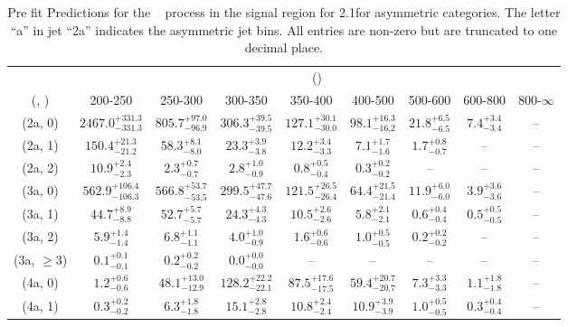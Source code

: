 \begin{table}[h!]
\tiny
\centering
\caption{Pre fit Predictions for the \zInv~ process in the signal region for 2.1\ifb for asymmetric categories. The letter ``a'' in jet \eg ``2a''  indicates the asymmetric jet bins. All entries are non-zero but are truncated to one decimal place.\label{tab:predsepnaive_sig_zinv_asym}}
\begin{tabular}
{ccccccccc}
	\hline\hline
	& \multicolumn{8}{c}{\scalht (\gev)} \\ 
	 (\njet,  \nb) & 200-250 & 250-300 & 300-350 & 350-400 & 400-500 & 500-600 & 600-800 & 800-$\infty$ \\ [0.8ex] 
\hline
	(2a, 0) & $2467.0^{+ 331.3 }_{- 331.3 }$ & $805.7^{+ 97.0 }_{- 96.9 }$ & $306.3^{+ 39.5 }_{- 39.5 }$ & $127.1^{+ 30.1 }_{- 30.0 }$ & $98.1^{+ 16.3 }_{- 16.2 }$ & $21.8^{+ 6.5 }_{- 6.5 }$ & $7.4^{+ 3.4 }_{- 3.4 }$ & -- \\[0.5ex] 
	(2a, 1) & $150.4^{+ 21.3 }_{- 21.2 }$ & $58.3^{+ 8.1 }_{- 8.0 }$ & $23.3^{+ 3.9 }_{- 3.8 }$ & $12.2^{+ 3.4 }_{- 3.3 }$ & $7.1^{+ 1.7 }_{- 1.6 }$ & $1.7^{+ 0.8 }_{- 0.7 }$ & -- & -- \\[0.5ex] 
	(2a, 2) & $10.9^{+ 2.4 }_{- 2.3 }$ & $2.3^{+ 0.7 }_{- 0.7 }$ & $2.8^{+ 1.0 }_{- 0.9 }$ & $0.8^{+ 0.5 }_{- 0.4 }$ & $0.3^{+ 0.2 }_{- 0.2 }$ & -- & -- & -- \\[0.5ex] 
	(3a, 0) & $562.9^{+ 106.4 }_{- 106.3 }$ & $566.8^{+ 53.7 }_{- 53.5 }$ & $299.5^{+ 47.7 }_{- 47.6 }$ & $121.5^{+ 26.5 }_{- 26.4 }$ & $64.4^{+ 21.5 }_{- 21.4 }$ & $11.9^{+ 6.0 }_{- 6.0 }$ & $3.9^{+ 3.6 }_{- 3.6 }$ & -- \\[0.5ex] 
	(3a, 1) & $44.7^{+ 8.9 }_{- 8.8 }$ & $52.7^{+ 5.7 }_{- 5.7 }$ & $24.3^{+ 4.3 }_{- 4.3 }$ & $10.5^{+ 2.6 }_{- 2.6 }$ & $5.8^{+ 2.1 }_{- 2.1 }$ & $0.6^{+ 0.4 }_{- 0.4 }$ & $0.5^{+ 0.5 }_{- 0.5 }$ & -- \\[0.5ex] 
	(3a, 2) & $5.9^{+ 1.4 }_{- 1.4 }$ & $6.8^{+ 1.1 }_{- 1.1 }$ & $4.0^{+ 1.0 }_{- 0.9 }$ & $1.6^{+ 0.6 }_{- 0.6 }$ & $1.0^{+ 0.5 }_{- 0.5 }$ & $0.2^{+ 0.2 }_{- 0.2 }$ & -- & -- \\[0.5ex] 
	(3a, $\ge3$) & $0.1^{+ 0.1 }_{- 0.1 }$ & $0.2^{+ 0.2 }_{- 0.2 }$ & $0.0^{+ 0.0 }_{- 0.0 }$ & -- & -- & -- & -- & -- \\[0.5ex] 
	(4a, 0) & $1.2^{+ 0.6 }_{- 0.6 }$ & $48.1^{+ 13.0 }_{- 12.9 }$ & $128.2^{+ 22.2 }_{- 22.1 }$ & $87.5^{+ 17.6 }_{- 17.5 }$ & $59.4^{+ 20.7 }_{- 20.7 }$ & $7.3^{+ 3.3 }_{- 3.3 }$ & $1.1^{+ 1.8 }_{- 1.8 }$ & -- \\[0.5ex] 
	(4a, 1) & $0.3^{+ 0.2 }_{- 0.2 }$ & $6.3^{+ 1.8 }_{- 1.8 }$ & $15.1^{+ 2.8 }_{- 2.8 }$ & $10.8^{+ 2.4 }_{- 2.4 }$ & $10.9^{+ 3.9 }_{- 3.9 }$ & $1.0^{+ 0.5 }_{- 0.5 }$ & $0.3^{+ 0.4 }_{- 0.4 }$ & -- \\[0.5ex] 

\end{tabular}
\end{table}
